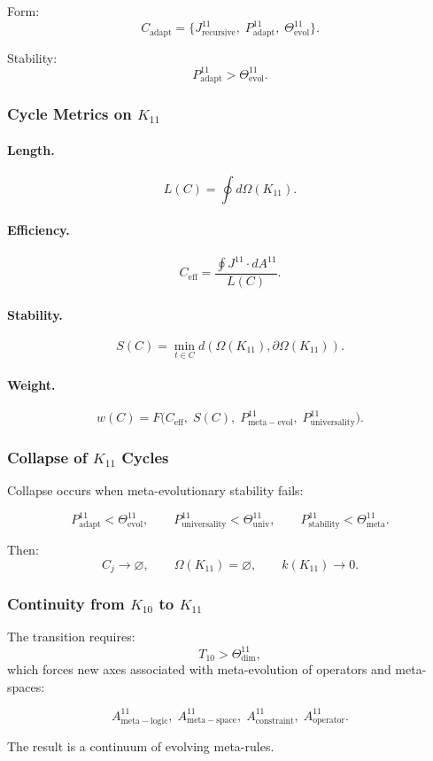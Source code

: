 Form:
\[
  C_{\mathrm{adapt}}
  =
  \{
    J^{11}_{\mathrm{recursive}},\;
    P^{11}_{\mathrm{adapt}},\;
    \Theta^{11}_{\mathrm{evol}}
  \}.
\]

Stability:
\[
  P^{11}_{\mathrm{adapt}}>\Theta^{11}_{\mathrm{evol}}.
\]


\subsubsection{Cycle Metrics on $K_{11}$}

\paragraph{Length.}
\[
  L(C)=\oint d\Omega(K_{11}).
\]

\paragraph{Efficiency.}
\[
  C_{\mathrm{eff}}
  =\frac{\oint J^{11}\cdot dA^{11}}{L(C)}.
\]

\paragraph{Stability.}
\[
  S(C)
  =\min_{t\in C} d(\Omega(K_{11}),\partial\Omega(K_{11})).
\]

\paragraph{Weight.}
\[
  w(C)
  =F\!\big(
        C_{\mathrm{eff}},\;
        S(C),\;
        P^{11}_{\mathrm{meta\!-\!evol}},\;
        P^{11}_{\mathrm{universality}}
      \big).
\]


\subsubsection{Collapse of $K_{11}$ Cycles}

Collapse occurs when meta-evolutionary stability fails:

\[
   P^{11}_{\mathrm{adapt}} < \Theta^{11}_{\mathrm{evol}},\qquad
   P^{11}_{\mathrm{universality}} < \Theta^{11}_{\mathrm{univ}},\qquad
   P^{11}_{\mathrm{stability}} < \Theta^{11}_{\mathrm{meta}}.
\]

Then:
\[
  C_j\to\varnothing,\qquad
  \Omega(K_{11})=\varnothing,\qquad
  k(K_{11})\to 0.
\]


\subsubsection{Continuity from $K_{10}$ to $K_{11}$}

The transition requires:
\[
  T_{10}>\Theta^{11}_{\mathrm{dim}},
\]
which forces new axes associated with meta-evolution of operators and
meta-spaces:

\[
  A^{11}_{\mathrm{meta\!-\!logic}},\;
  A^{11}_{\mathrm{meta\!-\!space}},\;
  A^{11}_{\mathrm{constraint}},\;
  A^{11}_{\mathrm{operator}}.
\]

The result is a continuum of evolving meta-rules.
